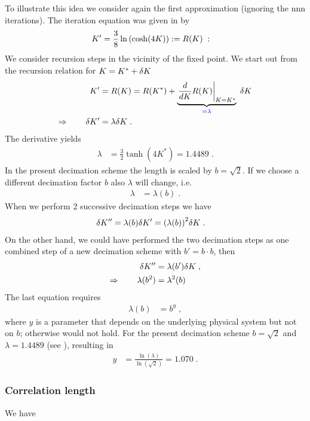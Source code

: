 To illustrate this idea we consider again the first approximation (ignoring the nnn
iterations). The iteration equation  was given in
 by
%
\begin{align*}
K' &= \frac{3}{8} \ln\qty( \cosh(4K)  ) := R(K)\;:
\end{align*}
%
We consider recursion steps in the vicinity of the fixed point.
We start out from the recursion relation for $K = K^{*}+\var K$
%
\begin{align*}
K' &= R(K) =R(K^{*}) + \underbrace{
\eval{\frac{d}{dK} R(K)}_{K=K^{*}}
}_{\color{blue} = \lambda}\;\var K\\
\Rightarrow\qquad \var K' &= \lambda \var K\;.
\end{align*}
%
The derivative yields
\begin{align}\label{eq:lambda}
\lambda &= \frac{3}{2} \tanh(4 K^{*}) = 1.4489\;.
\end{align}
%
In the present decimation scheme the length is scaled by $b=\sqrt{2}$. 
If we choose a different decimation factor $b$ also $\lambda$ will change, i.e.
%
\begin{align*}
\lambda &= \lambda(b)\;.
\end{align*}
%
When we perform 2 successive decimation steps  we have 
%
\begin{align*}
\var K'' &=\lambda(b) \var K' = \qty(\lambda(b))^{2} \var K\;.
\end{align*}
%
On the other hand, we could have performed the two decimation steps as one combined step of a new decimation scheme with $b'=b\cdot b$, then
%
\begin{align}
\var K'' &=\lambda(b') \var K\;,\nonumber \\
\Rightarrow\qquad \lambda(b^{2}) &= \lambda^{2}(b)\;\label{eq:RG:b}
\end{align}
%
The last equation requires
%
\begin{align*}
\lambda(b) &= b^{y}\;,
\end{align*}
%
where $y$ is a parameter that depends on the underlying physical system but not on $b$;
otherwise  would not hold. For the present decimation scheme $b=\sqrt{2}$ and 
$\lambda=1.4489$ (see ), resulting in 
%
\begin{align*}
y &= \frac{\ln(\lambda)}{\ln(\sqrt{2})} = 1.070\;.
\end{align*}
%


\subsubsection{Correlation length}
We have

